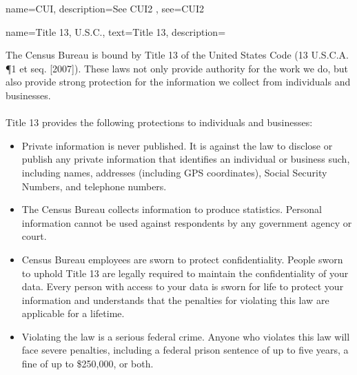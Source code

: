 {
    name=CUI,
    description={See  \gls{CUI2}    },
    see={CUI2}
}

{
name={Title 13, U.S.C.},
text=Title 13,
description={The Census Bureau is bound by Title 13 of the United States Code (13 U.S.C.A. \P 1 et seq. [2007]). These laws not only provide authority for the work we do, but also provide strong protection for the information we collect from individuals and businesses.\\
\\
Title 13 provides the following protections to individuals and businesses:
\begin{itemize}
\item     Private information is never published. It is against the law to disclose or publish any private information that identifies an individual or business such, including names, addresses (including GPS coordinates), Social Security Numbers, and telephone numbers.
\item     The Census Bureau collects information to produce statistics. Personal information cannot be used against respondents by any government agency or court.
\item   Census Bureau employees are sworn to protect confidentiality. People sworn to uphold Title 13 are legally required to maintain the confidentiality of your data. Every person with access to your data is sworn for life to protect your information and understands that the penalties for violating this law are applicable for a lifetime.
\item    Violating the law is a serious federal crime. Anyone who violates this law will face severe penalties, including a federal prison sentence of up to five years, a fine of up to \$250,000, or both.
\end{itemize} \parencite{us_code_title_1954}
}
}

